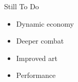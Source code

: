 \begin{frame}{Still To Do}
  \begin{itemize}
    \item Dynamic economy
    \item Deeper combat
    \item Improved art
    \item Performance
  \end{itemize}
\end{frame}




